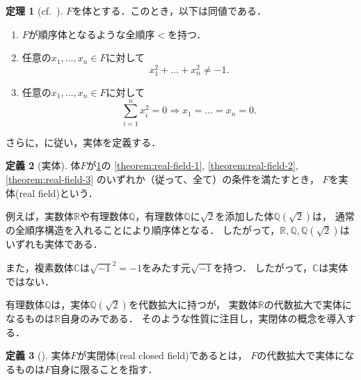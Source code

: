 \documentclass[uplatex, dvipdfmx]{jsarticle}
\numberwithin{equation}{section}
\newcommand{\R}{\mathbb{R}}
\newcommand{\Q}{\mathbb{Q}}
\newcommand{\C}{\mathbb{C}}
\theoremstyle{definition}
\newtheorem{definition}{定義}[section]
\newtheorem{theorem}[definition]{定理}
\begin{document}
\begin{theorem}[{cf.~\cite[Theorem 1.1.8]{MR1659509}}]\label{theorem:real-field}
     $F$を体とする．このとき，以下は同値である．
     \begin{enumerate}
          \item \label{theorem:real-field-1}
          $F$が順序体となるような全順序$<$を持つ．
          \item \label{theorem:real-field-2}
          任意の$x_1, \dots, x_n \in F$に対して
          \begin{equation}
               x_1^2 + \dots + x_n^2 \neq -1.
          \end{equation}
          \item \label{theorem:real-field-3}
          任意の$x_1, \dots, x_n \in F$に対して
          \begin{equation}
               \sum_{i=1}^n x_i^2 = 0 \Rightarrow x_1 = \dots = x_n = 0.
          \end{equation}
     \end{enumerate}
\end{theorem}

さらに，\cite[Definition 1.1.9]{MR1659509}に従い，実体を定義する．

\begin{definition}[実体]
     体$F$が\cref{theorem:real-field}の
     \ref{theorem:real-field-1},
     \ref{theorem:real-field-2},
     \ref{theorem:real-field-3}
     のいずれか（従って、全て）の条件を満たすとき，
     $F$を実体(real field)という．
\end{definition}


例えば，実数体$\R$や有理数体$\Q$，有理数体$\Q$に$\sqrt{2}$を添加した体$\Q\left(\sqrt{2}\right)$は，
通常の全順序構造を入れることにより順序体となる．
したがって，$\R, \Q, \Q\left(\sqrt{2}\right)$はいずれも実体である．

また，複素数体$\C$は$\sqrt{-1}^2 = -1$をみたす元$\sqrt{-1}$を持つ．
したがって，$\C$は実体ではない．

有理数体$\Q$は，実体$\Q\left(\sqrt{2}\right)$を代数拡大に持つが，
実数体$\R$の代数拡大で実体になるものは$\R$自身のみである．
そのような性質に注目し，実閉体の概念を導入する．

\begin{definition}[{\cite[Section I]{MR3069467}}] \label{definition:RCF}
     実体$F$が実閉体(real closed field)であるとは，
     $F$の代数拡大で実体になるものは$F$自身に限ることを指す．
\end{definition}
\end{document}
